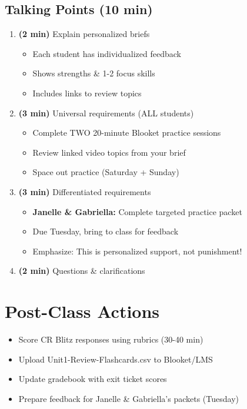 \documentclass[11pt]{article}
\begin{document}
\subsection*{Talking Points (10 min)}

\begin{enumerate}
    \item \textbf{(2 min)} Explain personalized briefs
    \begin{itemize}
        \item Each student has individualized feedback
        \item Shows strengths \& 1-2 focus skills
        \item Includes links to review topics
    \end{itemize}

    \item \textbf{(3 min)} Universal requirements (ALL students)
    \begin{itemize}
        \item Complete TWO 20-minute Blooket practice sessions
        \item Review linked video topics from your brief
        \item Space out practice (Saturday + Sunday)
    \end{itemize}

    \item \textbf{(3 min)} Differentiated requirements
    \begin{itemize}
        \item \textbf{Janelle \& Gabriella:} Complete targeted practice packet
        \item Due Tuesday, bring to class for feedback
        \item Emphasize: This is personalized support, not punishment!
    \end{itemize}

    \item \textbf{(2 min)} Questions \& clarifications
\end{enumerate}

\vspace{0.15in}

\section*{Post-Class Actions}

\begin{tcolorbox}[colback=yellow!10!white,colframe=orange!75!black,title=\textbf{Tonight's Tasks}]
\begin{itemize}[label=$\square$,leftmargin=*]
    \item Score CR Blitz responses using rubrics (30-40 min)
    \item Upload Unit1-Review-Flashcards.csv to Blooket/LMS
    \item Update gradebook with exit ticket scores
    \item Prepare feedback for Janelle \& Gabriella's packets (Tuesday)
\end{itemize}
\end{tcolorbox}
\end{document}
